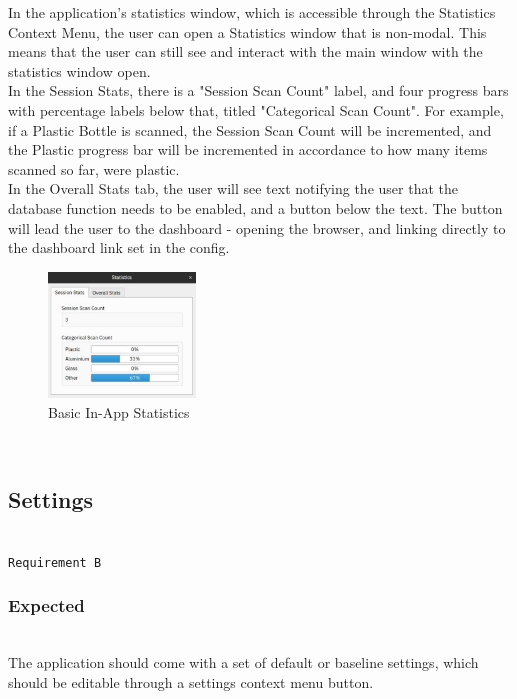 \documentclass[conference]{IEEEtran}
\begin{document}
In the application's statistics window, which is accessible through the Statistics Context Menu, the user can open a Statistics window that is non-modal. This means that the user can still see and interact with the main window with the statistics window open. \\

In the Session Stats, there is a "Session Scan Count" label, and four progress bars with percentage labels below that, titled "Categorical Scan Count". For example, if a Plastic Bottle is scanned, the Session Scan Count will be incremented, and the Plastic progress bar will be incremented in accordance to how many items scanned so far, were plastic.\\

In the Overall Stats tab, the user will see text notifying the user that the database function needs to be enabled, and a button below the text. The button will lead the user to the dashboard - opening the browser, and linking directly to the dashboard link set in the config.\\

\begin{figure}[!h]
    \centering
    \includegraphics[width=0.35\textwidth]{images/filled_session_stats.eps}
    \caption{Basic In-App Statistics}
\end{figure}~\\

\newpage
\subsection{Settings}~\\
\texttt{Requirement B}~\\
\subsubsection{Expected}~\\
The application should come with a set of default or baseline settings, which should be editable through a settings context menu button.~\\
\end{document}

